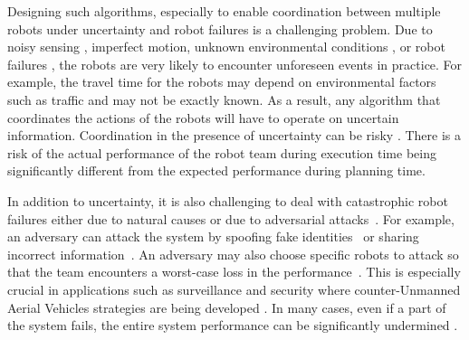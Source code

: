 Designing such algorithms, especially to enable coordination between multiple robots under uncertainty and robot failures is a challenging problem. Due to noisy sensing \cite{martinelli2005multi}, imperfect motion, unknown environmental conditions \cite{prorok2019redundant,chung2019risk}, or robot failures \cite{park2018robust}, the robots are very likely to encounter unforeseen events in practice. For example, the travel time for the robots may depend on environmental factors such as traffic and may not be exactly known. As a result, any algorithm that coordinates the actions of the robots will have to operate on uncertain information. Coordination in the presence of uncertainty can be risky \cite{prorok2019redundant,chung2019risk,mataric2003multi}. There is a risk of the actual performance of the robot team during execution time being significantly different from the expected performance during planning time. 

In addition to uncertainty, it is also challenging to deal with catastrophic robot failures either due to natural causes or due to adversarial attacks~\cite{denning2009spotlight,agmon2011multi,sless2014multi}. For example, an adversary can attack the system by spoofing fake identities~\cite{gil2017guaranteeing} or sharing incorrect information~\cite{saulnier2017resilient}. An adversary may also choose specific robots to attack so that the team encounters a worst-case loss in the performance~\cite{schlotfeldt2018resilient}. This is especially crucial in applications such as surveillance and security where counter-Unmanned Aerial Vehicles strategies are being developed \cite{cuas}. In many cases, even if a part of the system fails, the entire system performance can be significantly undermined \cite{tzoumas2018resilient,zhou2018resilient}. 

